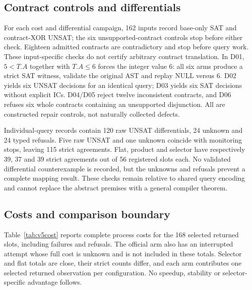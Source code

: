 \subsection{Contract controls and differentials}
For each cost and differential campaign, 162 inputs record base-only SAT and contract-XOR UNSAT; the six unsupported-contract controls stop before either check. Eighteen admitted contracts are contradictory and stop before query work. These input-specific checks do not certify arbitrary contract translation. In D01, $5<T.A$ together with $T.A\le6$ forces the integer value 6: all six arms produce a strict SAT witness, validate the original AST and replay NULL versus 6. D02 yields six UNSAT decisions for an identical query; D03 yields six SAT decisions without explicit ICs. D04/D05 reject twelve inconsistent contracts, and D06 refuses six whole contracts containing an unsupported disjunction. All are constructed repair controls, not naturally collected defects.

Individual-query records contain 120 raw UNSAT differentials, 24 unknown and 24 typed refusals. Five raw UNSAT and one unknown coincide with monitoring stops, leaving 115 strict agreements. Flat, product and selector have respectively 39, 37 and 39 strict agreements out of 56 registered slots each. No validated differential counterexample is recorded, but the unknowns and refusals prevent a complete mapping result. These checks remain relative to shared query encoding and cannot replace the abstract premises with a general compiler theorem.

\subsection{Costs and comparison boundary}
Table~\ref{tab:v5cost} reports complete process costs for the 168 selected returned slots, including failures and refusals. The official arm also has an interrupted attempt whose full cost is unknown and is not included in these totals. Selector and flat totals are close, their strict counts differ, and each arm contributes one selected returned observation per configuration. No speedup, stability or selector-specific advantage follows.

